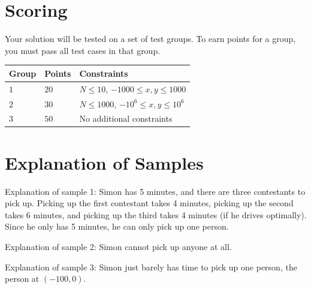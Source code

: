 \section*{Scoring}
Your solution will be tested on a set of test groups.
To earn points for a group, you must pass all test cases in that group.

\noindent
\begin{tabular}{| l | l | l |}
  \hline
  Group & Points & Constraints \\ \hline
  $1$   & $20$       & $N \leq 10$, $-1000 \leq x,y \leq 1000$ \\ \hline
  $2$   & $30$       & $N \leq 1000$, $-10^6 \leq x,y \leq 10^6$ \\ \hline
  $3$   & $50$       & No additional constraints \\ \hline
\end{tabular}

\section*{Explanation of Samples}
Explanation of sample 1: Simon has 5 minutes, and there are three contestants to pick up. Picking up the first contestant takes 4 minutes, picking up the second takes 6 minutes, and picking up the third takes 4 minutes (if he drives optimally). Since he only has 5 minutes, he can only pick up one person.

Explanation of sample 2: Simon cannot pick up anyone at all.

Explanation of sample 3: Simon just barely has time to pick up one person, the person at $(-100, 0)$.
